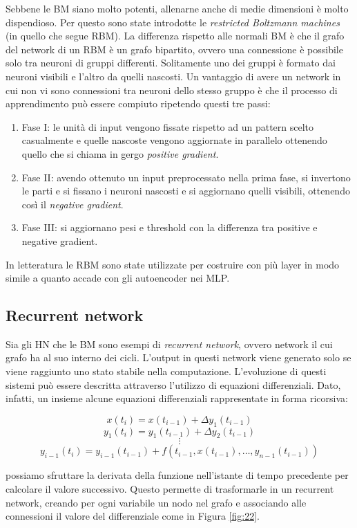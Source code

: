 \documentclass[10pt,a4paper]{article}
\begin{document}
 Sebbene le BM siano molto potenti, allenarne anche di medie dimensioni è molto dispendioso. Per questo sono state introdotte le \emph{restricted Boltzmann machines} (in quello che segue RBM). La differenza rispetto alle normali BM è che il grafo del network di un RBM è un grafo bipartito, ovvero una connessione è possibile solo tra neuroni di gruppi differenti. Solitamente uno dei gruppi è formato dai neuroni visibili e l'altro da quelli nascosti. Un vantaggio di avere un network in cui non vi sono connessioni tra neuroni dello stesso gruppo è che il processo di apprendimento può essere compiuto ripetendo questi tre passi:
\begin{enumerate}
\item{Fase I: le unità di input vengono fissate rispetto ad un pattern scelto casualmente e quelle nascoste vengono aggiornate in parallelo ottenendo quello che si chiama in gergo \emph{positive gradient}.}
\item{Fase II: avendo ottenuto un input preprocessato nella prima fase, si invertono le parti e si fissano i neuroni nascosti e si aggiornano quelli visibili, ottenendo così il \emph{negative gradient}.}
\item{Fase III: si aggiornano pesi e threshold con la differenza tra positive e negative gradient.}
\end{enumerate}
In letteratura le RBM sono state utilizzate per costruire con più layer in modo simile a quanto accade con gli autoencoder nei MLP.
 
\subsection{Recurrent network}

Sia gli HN che le BM sono esempi di \emph{recurrent network}, ovvero network il cui grafo ha al suo interno dei cicli. L'output in questi network viene generato solo se viene raggiunto uno stato stabile nella computazione. L'evoluzione di questi sistemi può essere descritta attraverso l'utilizzo di equazioni differenziali. Dato, infatti, un insieme alcune equazioni differenziali rappresentate in forma ricorsiva:

$$
x(t_i) = x(t_{i-1}) + \Delta y_1(t_{i-1})
$$
$$
y_1(t_i) = y_1(t_{i-1}) + \Delta y_2(t_{i-1})
$$
$$
\vdots
$$
$$
y_{i-1}(t_i) = y_{i-1}(t_{i-1}) + f(t_{i-1}, x(t_{i-1}), \dots, y_{n-1}(t_{i-1}))
$$

possiamo sfruttare la derivata della funzione nell'istante di tempo precedente per calcolare il valore successivo. Questo permette di trasformarle in un recurrent network, creando per ogni variabile un nodo nel grafo e associando alle connessioni il valore del differenziale come in Figura \ref{fig:22}.
\end{document}
